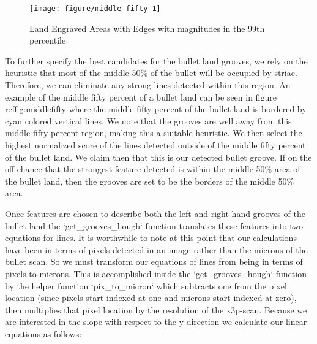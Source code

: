 \documentclass[12pt]{article}\usepackage[]{graphicx}\usepackage[]{color}
\newenvironment{knitrout}{}{} %
\theoremstyle{nonumberplain}
\begin{document}
\begin{knitrout}
\color{fgcolor}\begin{figure}

{\centering \texttt{[image: figure/middle-fifty-1]} 

}

\caption[Land Engraved Areas with Edges with magnitudes in the 99th percentile]{Land Engraved Areas with Edges with magnitudes in the 99th percentile}\label{fig:middle-fifty}
\end{figure}


\end{knitrout}


To further specify the best candidates for the bullet land grooves, we rely on the heuristic that most of the middle 50\% of the bullet will be occupied by striae. Therefore, we can eliminate any strong lines detected within this region. An example of the middle fifty percent of a bullet land can be seen in figure ref{fig:middlefifty} where the middle fifty percent of the bullet land is bordered by cyan colored vertical lines. We note that the grooves are well away from this middle fifty percent region, making this a suitable heuristic. We then select the highest normalized score of the lines detected outside of the middle fifty percent of the bullet land. We claim then that this is our detected bullet groove. If on the off chance that the strongest feature detected is within the middle 50\% area of the bullet land, then the grooves are set to be the borders of the middle 50\% area. 

Once features are chosen to describe both the left and right hand grooves of the bullet land the `get\_grooves\_hough` function translates these features into two equations for lines. It is worthwhile to note at this point that our calculations have been in terms of pixels detected in an image rather than the microns of the bullet scan. So we must transform our equations of lines from being in terms of pixels to microns. This is accomplished inside the `get\_grooves\_hough` function by the helper function `pix\_to\_micron` which subtracts one from the pixel location (since pixels start indexed at one and microns start indexed at zero), then multiplies that pixel location by the resolution of the x3p-scan. Because we are interested in the slope with respect to the y-direction we calculate our linear equations as follows:
\end{document}
